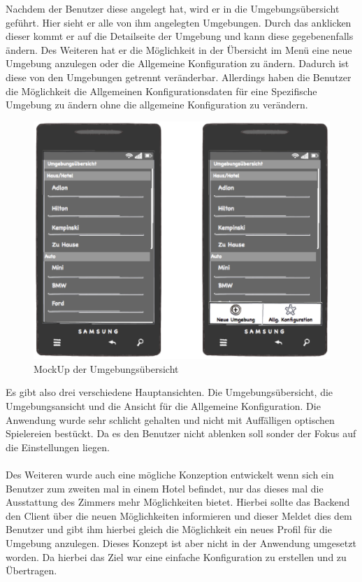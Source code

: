 Nachdem der Benutzer diese angelegt hat, wird er in die Umgebungsübersicht geführt. Hier sieht er alle von ihm angelegten Umgebungen. Durch das anklicken dieser kommt er auf die Detailseite der Umgebung und kann diese gegebenenfalls ändern.       
Des Weiteren hat er die Möglichkeit in der Übersicht im Menü eine neue Umgebung anzulegen oder die Allgemeine Konfiguration zu ändern. Dadurch ist diese von den Umgebungen getrennt veränderbar. Allerdings haben die Benutzer die Möglichkeit die Allgemeinen Konfigurationsdaten für eine Spezifische Umgebung zu ändern ohne die allgemeine Konfiguration zu verändern. 

\begin{figure}[H]
\includegraphics[width=12.5cm]{MockUps/Umgebung}
\caption{MockUp der Umgebungsübersicht}
\end{figure}

Es gibt also drei verschiedene Hauptansichten. Die Umgebungsübersicht, die Umgebungsansicht und die Ansicht für die Allgemeine Konfiguration. Die Anwendung wurde sehr schlicht gehalten und nicht mit Auffälligen optischen Spielereien bestückt. Da es den Benutzer nicht ablenken soll sonder der Fokus auf die Einstellungen liegen. 
\\\\
Des Weiteren wurde auch eine mögliche Konzeption entwickelt wenn sich ein Benutzer zum zweiten mal in einem Hotel befindet, nur das dieses mal die Ausstattung des Zimmers mehr Möglichkeiten bietet. Hierbei sollte das Backend den Client über die neuen Möglichkeiten informieren und dieser Meldet dies dem Benutzer und gibt ihm hierbei gleich die Möglichkeit ein neues Profil für die Umgebung anzulegen. Dieses Konzept ist aber nicht in der Anwendung umgesetzt worden. Da hierbei das Ziel war eine einfache Konfiguration zu erstellen und zu Übertragen.

